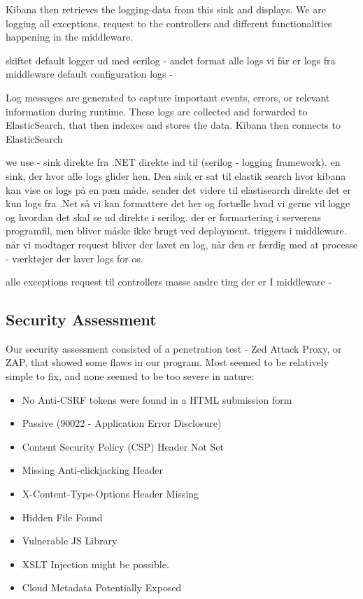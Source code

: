 Kibana then retrieves the logging-data from this sink and displays.
We are logging all exceptions, request to the controllers and different functionalities happening in the middleware. 

skiftet default logger ud med serilog - andet format 
alle logs vi får er logs fra middleware 
default configuration logs - 




Log messages are generated to capture important events, errors, or relevant information during runtime. These logs are collected and forwarded to ElasticSearch, that then indexes and stores the data. Kibana then connects to ElasticSearch 

we use - sink direkte fra .NET direkte ind til (serilog - logging framework). en sink, der hvor alle logs glider hen. Den sink er sat til elastik search hvor kibana kan vise os logs på en pæn måde.
sender det videre til elastisearch direkte
det er kun logs fra .Net så vi kan formattere det her og fortælle hvad vi gerne vil logge og hvordan det skal se ud direkte i serilog. 
der er formartering i serverens programfil, men bliver måske ikke brugt ved deployment. 
triggers i middleware. når vi modtager request bliver der lavet en log, når den er færdig med at processe - værktøjer der laver logs for os. 

alle exceptions
request til controllers
masse andre ting der er I middleware - 


\subsection{Security Assessment}

Our security assessment consisted of a penetration test - Zed Attack Proxy, or ZAP, that showed some flaws in our program. Most seemed to be relatively simple to fix, and none seemed to be too severe in nature:
\begin{itemize}
    \item No Anti-CSRF tokens were found in a HTML submission form
    \item Passive (90022 - Application Error Disclosure)
    \item Content Security Policy (CSP) Header Not Set
    \item Missing Anti-clickjacking Header
    \item X-Content-Type-Options Header Missing
    \item Hidden File Found
    \item Vulnerable JS Library
    \item XSLT Injection might be possible.
    \item Cloud Metadata Potentially Exposed
\end{itemize}


